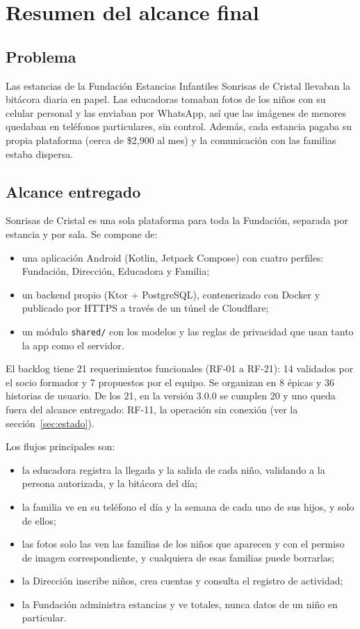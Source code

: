 \section{Resumen del alcance final}

\subsection{Problema}
Las estancias de la Fundación Estancias Infantiles Sonrisas de Cristal llevaban la bitácora diaria en papel. Las educadoras tomaban fotos de los niños con su celular personal y las enviaban por WhatsApp, así que las imágenes de menores quedaban en teléfonos particulares, sin control. Además, cada estancia pagaba su propia plataforma (cerca de \$2,900 al mes) y la comunicación con las familias estaba dispersa.

\subsection{Alcance entregado}
Sonrisas de Cristal es una sola plataforma para toda la Fundación, separada por estancia y por sala. Se compone de:
\begin{itemize}
	\item una aplicación Android (Kotlin, Jetpack Compose) con cuatro perfiles: Fundación, Dirección, Educadora y Familia;
	\item un backend propio (Ktor + PostgreSQL), contenerizado con Docker y publicado por HTTPS a través de un túnel de Cloudflare;
	\item un módulo \texttt{shared/\allowbreak{}} con los modelos y las reglas de privacidad que usan tanto la app como el servidor.
\end{itemize}

El backlog tiene 21 requerimientos funcionales (RF-01 a RF-21): 14 validados por el socio formador y 7 propuestos por el equipo. Se organizan en 8 épicas y 36 historias de usuario. De los 21, en la versión 3.0.0 se cumplen 20 y uno queda fuera del alcance entregado: RF-11, la operación sin conexión (ver la sección~\ref{sec:estado}).

Los flujos principales son:
\begin{itemize}
	\item la educadora registra la llegada y la salida de cada niño, validando a la persona autorizada, y la bitácora del día;
	\item la familia ve en su teléfono el día y la semana de cada uno de sus hijos, y solo de ellos;
	\item las fotos solo las ven las familias de los niños que aparecen y con el permiso de imagen correspondiente, y cualquiera de esas familias puede borrarlas;
	\item la Dirección inscribe niños, crea cuentas y consulta el registro de actividad;
	\item la Fundación administra estancias y ve totales, nunca datos de un niño en particular.
\end{itemize}

